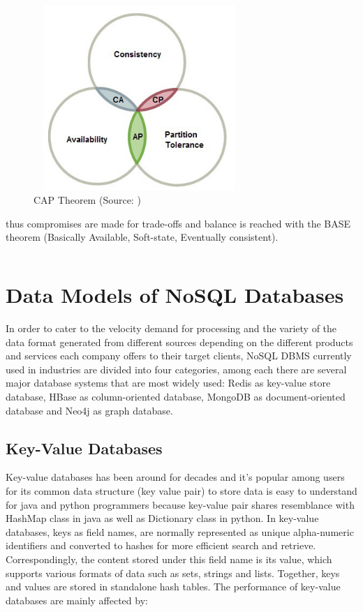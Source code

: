 \begin{figure}[H]
	\includegraphics[height=7cm, width=8cm]{../../../images/cap.png}
	\caption{CAP Theorem (Source: \cite{Brewer2012CAPTY})}
\end{figure}

\noindent thus compromises are made for trade-offs and balance is reached with the BASE theorem \cite{Brewer2012CAPTY}(Basically Available, Soft-state, Eventually consistent).

\[\]

\section{Data Models of NoSQL Databases}

 In order to cater to the velocity demand for processing and the variety of the data format generated from different sources depending on the different products and services each company offers to their target clients, NoSQL DBMS currently used in industries are divided into four categories, among each  there are several major database systems that are most widely used: Redis as key-value store database, HBase as column-oriented database, MongoDB as document-oriented database and Neo4j as graph database.

\subsection{Key-Value Databases}

Key-value databases has been around for decades and it's popular among users for its common data structure (key value pair) to store data is easy to understand for java and python programmers because key-value pair shares resemblance with HashMap class in java as well as Dictionary class in python. In key-value databases, keys as field names, are normally represented as unique alpha-numeric identifiers and converted to hashes for more efficient search and retrieve. Correspondingly, the content stored under this field name is its value, which supports various formats of data such as sets, strings and lists. Together, keys and values are stored in standalone hash tables. The performance of key-value databases are mainly affected by:


